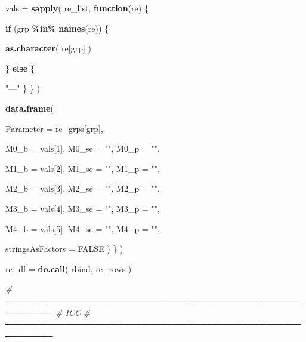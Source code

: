 \documentclass[
]{article}
\newenvironment{Shaded}{\begin{snugshade}}{\end{snugshade}}
\newcommand{\AttributeTok}[1]{\textcolor[rgb]{0.13,0.29,0.53}{#1}}
\newcommand{\CommentTok}[1]{\textcolor[rgb]{0.56,0.35,0.01}{\textit{#1}}}
\newcommand{\ConstantTok}[1]{\textcolor[rgb]{0.56,0.35,0.01}{#1}}
\newcommand{\ControlFlowTok}[1]{\textcolor[rgb]{0.13,0.29,0.53}{\textbf{#1}}}
\newcommand{\DecValTok}[1]{\textcolor[rgb]{0.00,0.00,0.81}{#1}}
\newcommand{\FunctionTok}[1]{\textcolor[rgb]{0.13,0.29,0.53}{\textbf{#1}}}
\newcommand{\NormalTok}[1]{#1}
\newcommand{\OtherTok}[1]{\textcolor[rgb]{0.56,0.35,0.01}{#1}}
\newcommand{\SpecialCharTok}[1]{\textcolor[rgb]{0.81,0.36,0.00}{\textbf{#1}}}
\newcommand{\StringTok}[1]{\textcolor[rgb]{0.31,0.60,0.02}{#1}}
\begin{document}
\begin{Shaded}
\begin{Highlighting}[]
\NormalTok{        vals }\OtherTok{=}
          \FunctionTok{sapply}\NormalTok{(}
\NormalTok{            re\_list,}
            \ControlFlowTok{function}\NormalTok{(re) \{}

              \ControlFlowTok{if}\NormalTok{ (grp }\SpecialCharTok{\%in\%} \FunctionTok{names}\NormalTok{(re)) \{}

                \FunctionTok{as.character}\NormalTok{(}
\NormalTok{                  re[grp]}
\NormalTok{                )}

\NormalTok{              \} }\ControlFlowTok{else}\NormalTok{ \{}

                \StringTok{"—"}
\NormalTok{              \}}
\NormalTok{            \}}
\NormalTok{          )}

        \FunctionTok{data.frame}\NormalTok{(}

          \AttributeTok{Parameter =}
\NormalTok{            re\_grps[grp],}

          \AttributeTok{M0\_b =}\NormalTok{ vals[}\DecValTok{1}\NormalTok{],}
          \AttributeTok{M0\_se =} \StringTok{""}\NormalTok{,}
          \AttributeTok{M0\_p =} \StringTok{""}\NormalTok{,}

          \AttributeTok{M1\_b =}\NormalTok{ vals[}\DecValTok{2}\NormalTok{],}
          \AttributeTok{M1\_se =} \StringTok{""}\NormalTok{,}
          \AttributeTok{M1\_p =} \StringTok{""}\NormalTok{,}

          \AttributeTok{M2\_b =}\NormalTok{ vals[}\DecValTok{3}\NormalTok{],}
          \AttributeTok{M2\_se =} \StringTok{""}\NormalTok{,}
          \AttributeTok{M2\_p =} \StringTok{""}\NormalTok{,}

          \AttributeTok{M3\_b =}\NormalTok{ vals[}\DecValTok{4}\NormalTok{],}
          \AttributeTok{M3\_se =} \StringTok{""}\NormalTok{,}
          \AttributeTok{M3\_p =} \StringTok{""}\NormalTok{,}

          \AttributeTok{M4\_b =}\NormalTok{ vals[}\DecValTok{5}\NormalTok{],}
          \AttributeTok{M4\_se =} \StringTok{""}\NormalTok{,}
          \AttributeTok{M4\_p =} \StringTok{""}\NormalTok{,}

          \AttributeTok{stringsAsFactors =} \ConstantTok{FALSE}
\NormalTok{        )}
\NormalTok{      \}}
\NormalTok{    )}


\NormalTok{  re\_df }\OtherTok{=}
    \FunctionTok{do.call}\NormalTok{(}
\NormalTok{      rbind,}
\NormalTok{      re\_rows}
\NormalTok{    )}


  \CommentTok{\# ──────────────────────────────────────────────────────────}
  \CommentTok{\# ICC}
  \CommentTok{\# ──────────────────────────────────────────────────────────}


\end{Highlighting}
\end{Shaded}
\end{document}
